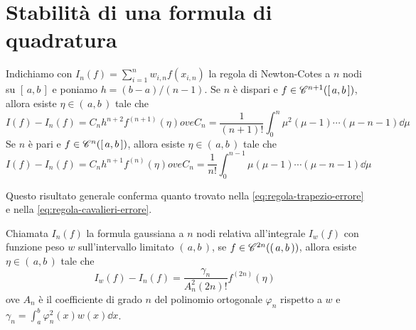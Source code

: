 \section[Stabilità delle formule]{Stabilità di una formula di quadratura}
	
	\begin{teorema}
		Indichiamo con \(I_n (f) = \sum_{i = 1}^n w_{i, n} f (x_{i, n})\) la regola di Newton-Cotes a \(n\) nodi su \([\, a, b \,]\) e poniamo \(h = (b - a) / (n - 1)\). Se \(n\) è dispari e \(f \in \mathscr{C}^{n + 1} ([\, a, b \,])\), allora esiste \(\eta \in (\, a, b \,)\) tale che
		\begin{subequations}
			\begin{equation}
				I (f) - I_n (f) = C_n h^{n + 2} f^{(n + 1)} (\eta)
			\end{equation}
			ove
			\begin{equation}
				C_n = \frac{1}{(n + 1)!} \int_0^n \mu^2 (\mu - 1) \cdots (\mu - n - 1) \dd{\mu}
			\end{equation}
		\end{subequations}
		Se \(n\) è pari e \(f \in \mathscr{C}^{n} ([\, a, b \,])\), allora esiste \(\eta \in (\, a, b \,)\) tale che
		\begin{subequations}
			\begin{equation}
				I (f) - I_n (f) = C_n h^{n + 1} f^{(n)} (\eta)
			\end{equation}
			ove
			\begin{equation}
				C_n = \frac{1}{n!} \int_0^{n - 1} \mu (\mu - 1) \cdots (\mu - n - 1) \dd{\mu}
			\end{equation}
		\end{subequations}
	\end{teorema}

	Questo risultato generale conferma quanto trovato nella \eqref{eq:regola-trapezio-errore} e nella \eqref{eq:regola-cavalieri-errore}.
	
	\begin{teorema}
		Chiamata \(I_n (f)\) la formula gaussiana a \(n\) nodi relativa all'integrale \(I_w (f)\) con funzione peso \(w\) sull'intervallo limitato \((\, a, b \,)\), se \(f \in \mathscr{C}^{2 n} ((\, a, b \,))\), allora esiste \(\eta \in (\, a, b \,)\) tale che
		\begin{equation}
			I_w (f) - I_n (f) = \frac{\gamma_n}{A_n^2 (2 n)!} f^{(2 n)} (\eta)
		\end{equation}
		ove \(A_n\) è il coefficiente di grado \(n\) del polinomio ortogonale \(\varphi_n\) rispetto a \(w\) e \(\gamma_n = \int_a^b \varphi_n^2 (x) w (x) \dd{x}\).
	\end{teorema}

